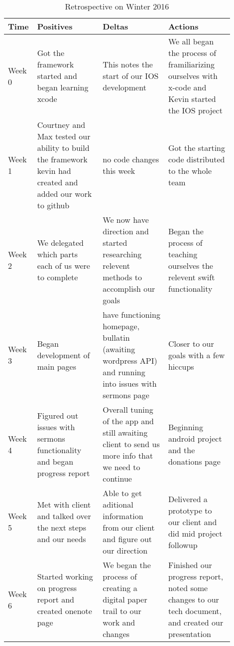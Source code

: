 \documentclass[letterpaper,10pt,draftclsnofoot,onecolumn,titlepage]{IEEEtran}
\begin{document}
		\begin{table}[H]
			\caption{Retrospective on Winter 2016}
			\begin{center}
				\begin{tabular}{| p{0.06\linewidth} | p{0.28\linewidth} | p{0.28\linewidth} | p{0.28\linewidth} | }
					\hline
					\textbf{Time} & \textbf{Positives} & \textbf{Deltas} & \textbf{Actions} \\ [0.5ex]
					\hline
					Week 0 & Got the framework started and began learning xcode & This notes the start of our IOS development & We all began the process of framiliarizing ourselves with x-code and Kevin started the IOS project \\
					\hline
					Week 1 & Courtney and Max tested our ability to build the framework kevin had created and added our work to github & no code changes this week & Got the starting code distributed to the whole team \\
					\hline
					Week 2 & We delegated which parts each of us were to complete & We now have direction and started researching relevent methods to accomplish our goals & Began the process of teaching ourselves the relevent swift functionality \\
					\hline
					Week 3 & Began development of main pages & have functioning homepage, bullatin (awaiting wordpress API) and running into issues with sermons page & Closer to our goals with a few hiccups \\
					\hline
					Week 4 & Figured out issues with sermons functionality and began progress report & Overall tuning of the app and still awaiting client to send us more info that we need to continue & Beginning android project and the donations page \\
					\hline
					Week 5 & Met with client and talked over the next steps and our needs & Able to get aditional information from our client and figure out our direction & Delivered a prototype to our client and did mid project followup \\
					\hline
					Week 6 & Started working on progress report and created onenote page & We began the process of creating a digital paper trail to our work and changes & Finished our progress report, noted some changes to our tech document, and created our presentation \\
					\hline
					
\end{tabular}
			\end{center}
			\end{table}
\end{document}
